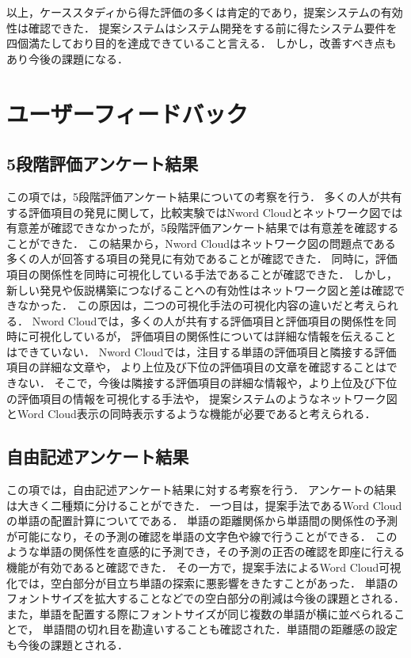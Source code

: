\documentclass[syuuron]{kuee}
\begin{document}
		以上，ケーススタディから得た評価の多くは肯定的であり，提案システムの有効性は確認できた．
		提案システムはシステム開発をする前に得たシステム要件を四個満たしており目的を達成できていること言える．
		しかし，改善すべき点もあり今後の課題になる．
		
	\section{ユーザーフィードバック}
		\subsection{5段階評価アンケート結果}
		この項では，5段階評価アンケート結果についての考察を行う．
		多くの人が共有する評価項目の発見に関して，比較実験ではNword Cloudとネットワーク図では
		有意差が確認できなかったが，5段階評価アンケート結果では有意差を確認することができた．
		この結果から，Nword Cloudはネットワーク図の問題点である多くの人が回答する項目の発見に有効であることが確認できた．
		同時に，評価項目の関係性を同時に可視化している手法であることが確認できた．
		しかし，新しい発見や仮説構築につなげることへの有効性はネットワーク図と差は確認できなかった．
		この原因は，二つの可視化手法の可視化内容の違いだと考えられる．
		Nword Cloudでは，多くの人が共有する評価項目と評価項目の関係性を同時に可視化しているが，
		評価項目の関係性については詳細な情報を伝えることはできていない．
		Nword Cloudでは，注目する単語の評価項目と隣接する評価項目の詳細な文章や，
		より上位及び下位の評価項目の文章を確認することはできない．
		そこで，今後は隣接する評価項目の詳細な情報や，より上位及び下位の評価項目の情報を可視化する手法や，
		提案システムのようなネットワーク図とWord Cloud表示の同時表示するような機能が必要であると考えられる．
		
		\subsection{自由記述アンケート結果}
		この項では，自由記述アンケート結果に対する考察を行う．
		アンケートの結果は大きく二種類に分けることができた．
		一つ目は，提案手法であるWord Cloudの単語の配置計算についてである．
		単語の距離関係から単語間の関係性の予測が可能になり，その予測の確認を単語の文字色や線で行うことができる．
		このような単語の関係性を直感的に予測でき，その予測の正否の確認を即座に行える機能が有効であると確認できた．
		その一方で，提案手法によるWord Cloud可視化では，空白部分が目立ち単語の探索に悪影響をきたすことがあった．
		単語のフォントサイズを拡大することなどでの空白部分の削減は今後の課題とされる．
		また，単語を配置する際にフォントサイズが同じ複数の単語が横に並べられることで，
		単語間の切れ目を勘違いすることも確認された．単語間の距離感の設定も今後の課題とされる．
	
\end{document}

